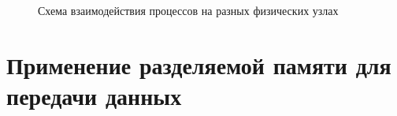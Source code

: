 \begin{figure}[!h]
\caption{Схема взаимодействия процессов на разных физических узлах}
\label{chapter31:ModuleStackExample}
\end{figure}

%
%
%
%
%
%
%
\section{Применение разделяемой памяти для передачи данных}\label{chapter31:SharedMemoryOptimization}

